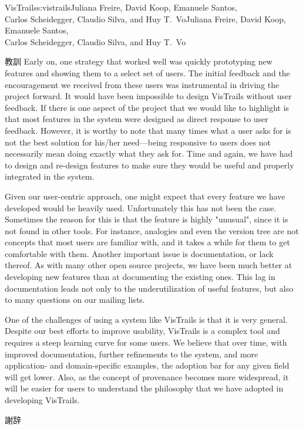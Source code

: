 \begin{aosachaptertoc}{VisTrails}{s:vistrails}{Juliana Freire, David Koop, Emanuele Santos, \\ Carlos Scheidegger, Claudio Silva, and Huy T.\ Vo}{Juliana Freire, David Koop, Emanuele Santos, \\ \hspace*{0.9cm} Carlos Scheidegger, Claudio Silva, and Huy T.\ Vo}
\begin{aosasect1}{教訓}
Early on, one strategy that worked well was quickly prototyping new
features and showing them to a select set of users. The initial
feedback and the encouragement we received from these users was
instrumental in driving the project forward. It would have been
impossible to design VisTrails without user feedback. If there is one
aspect of the project that we would like to highlight is that most
features in the system were designed as direct response to user
feedback. However, it is worthy to note that many times what a user
asks for is not the best solution for his/her need---being responsive
to users does not necessarily mean doing exactly what they ask for.
Time and again, we have had to design and re-design features to make
sure they would be useful and properly integrated in the system.

Given our user-centric approach, one might expect that every feature
we have developed would be heavily used. Unfortunately this has not
been the case.  Sometimes the reason for this is that the feature is
highly "unusual", since it is not found in other tools. For instance,
analogies and even the version tree are not concepts that most users
are familiar with, and it takes a while for them to get comfortable
with them. Another important issue is documentation, or lack
thereof. As with many other open source projects, we have been much
better at developing new features than at documenting the existing
ones. This lag in documentation leads not only to the underutilization
of useful features, but also to many questions on our mailing lists.

One of the challenges of using a system like VisTrails is that it is
very general. Despite our best efforts to improve usability, VisTrails
is a complex tool and requires a steep learning curve for some
users. We believe that over time, with improved documentation, further
refinements to the system, and more application- and domain-specific
examples, the adoption bar for any given field will get lower. Also,
as the concept of provenance becomes more widespread, it will be
easier for users to understand the philosophy that we have adopted in
developing VisTrails.

\begin{aosasect2}{謝辞}


\end{aosasect2}
\end{aosasect1}
\end{aosachaptertoc}
